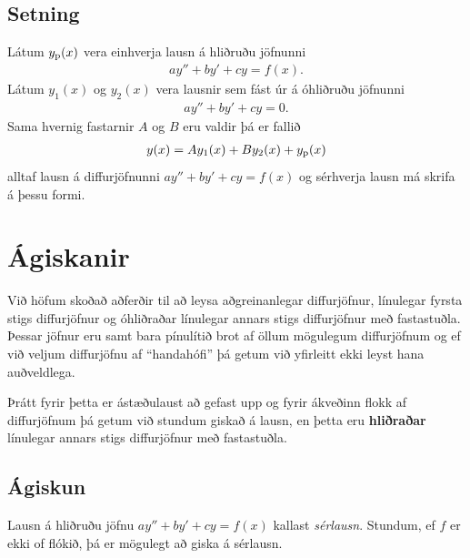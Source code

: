 \documentclass[b5paper,11pt,icelandic]{sphinxmanual}
\begin{document}
\subsection{Setning}
\label{kafli08:id4}
Látum \(y_{\rm p}(x)\) vera einhverja lausn á hliðruðu jöfnunni
\begin{equation*}
\begin{split}ay''+by'+cy=f(x).\end{split}
\end{equation*}
Látum \(y_1(x)\) og \(y_2(x)\) vera lausnir sem fást úr {\hyperref[kafli08:stigs\string-ohlidrud]{}} á
óhliðruðu jöfnunni
\begin{equation*}
\begin{split}ay''+by'+cy=0.\end{split}
\end{equation*}
Sama hvernig fastarnir \(A\) og \(B\) eru valdir þá er fallið
\begin{equation*}
\begin{split}y(x)=Ay_1(x)+By_2(x)+y_{\rm p}(x)\end{split}
\end{equation*}
alltaf lausn á diffurjöfnunni \(ay''+by'+cy=f(x)\) og sérhverja
lausn má skrifa á þessu formi.


\section{Ágiskanir}
\label{kafli08:agiskanir}
Við höfum skoðað aðferðir til að leysa aðgreinanlegar diffurjöfnur,
línulegar fyrsta stigs diffurjöfnur og óhliðraðar línulegar
annars stigs diffurjöfnur með fastastuðla. Þessar jöfnur eru
samt bara pínulítið brot af öllum mögulegum diffurjöfnum og ef við
veljum diffurjöfnu af ``handahófi'' þá getum við yfirleitt ekki
leyst hana auðveldlega.

Þrátt fyrir þetta er ástæðulaust að gefast upp og fyrir ákveðinn flokk
af diffurjöfnum þá getum við stundum giskað á lausn, en þetta eru
\textbf{hliðraðar} línulegar annars stigs diffurjöfnur með fastastuðla.


\subsection{Ágiskun}
\label{kafli08:agiskun}\label{kafli08:id5}\label{kafli08:index-7}
Lausn á hliðruðu jöfnu \(ay''+by'+cy=f(x)\) kallast \emph{sérlausn}.
Stundum, ef \(f\) er ekki of flókið, þá er mögulegt að giska á sérlausn.
\end{document}
